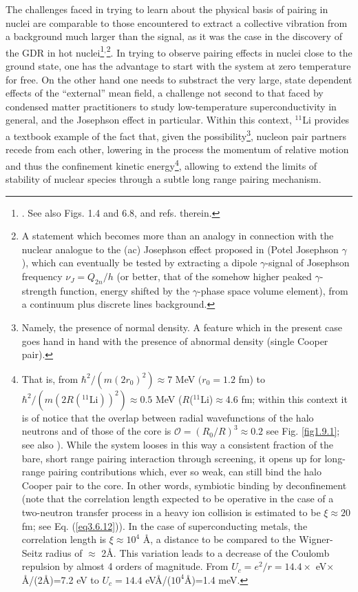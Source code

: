 The challenges faced in trying to learn about the physical basis of pairing in nuclei are comparable to those encountered to extract a   collective vibration from a background much larger than the signal, as it was the case  in the discovery of the GDR in hot nuclei\footnote{\cite{Snover:86,Gaardhoje:85,Gaardhoje:86}. See also \cite{Bortignon:98} Figs. 1.4 and 6.8, and refs. therein.}$^,$\footnote{A statement which becomes more than an analogy in connection with the nuclear analogue to the (ac) Josephson effect proposed in \cite{Potel:20b,yy} (Potel Josephson $\gamma$), which can eventually be tested by extracting a dipole $\gamma$-signal of Josephson frequency $\nu_J=Q_{2n}/h$ (or better, that of the somehow higher peaked $\gamma$-strength function, energy shifted by the $\gamma$-phase space volume element), from a continuum plus discrete lines background.}. In trying to observe  pairing effects in nuclei close to the ground state, one has the advantage to start with the system at zero temperature for free. On the other hand one needs to substract the very large, state dependent effects of the ``external'' mean field, a challenge not second to that faced by condensed matter practitioners to study low-temperature superconductivity in general, and the Josephson effect in particular.  Within this context, $^{11}$Li provides a textbook example of the fact that, given the possibility\footnote{\label{f39C4} Namely, the presence of normal density. A feature which in the present case goes hand in hand with the presence of abnormal density (single Cooper pair).}, nucleon pair partners recede from each other, lowering in the process the momentum of relative motion and thus the confinement kinetic 
 energy\footnote{\label{f40C4} That is, from $\hbar^2/(m(2r_0)^2)\approx 7$ MeV $(r_0=1.2$ fm) to $\hbar^2/(m(2R(^{11}\text{Li}))^2)\approx 0.5$ MeV ($R$($^{11}$Li)$\approx$4.6 fm; within this context it is of notice that the overlap between radial wavefunctions of the halo neutrons and of those of the core is $\mathcal O=(R_0/R)^3\approx0.2$  see Fig. \ref{fig1.9.1}; see also \cite{Broglia:19b}). While the system looses in this way a consistent fraction of the bare, short range pairing interaction through screening, it opens up for long-range pairing contributions which, ever so weak, can still bind the halo Cooper pair to the core. In other words, symbiotic binding by  deconfinement (note that the correlation length expected to be operative in the case of a two-neutron transfer process in a heavy ion collision is estimated to be $\xi\approx20$ fm;  see Eq. (\ref{eq3.6.12})). In the case of superconducting metals, the correlation length is $\xi\approx 10^4$ \AA, a distance to be compared to the Wigner-Seitz radius of $\approx$ 2\AA. This variation leads to a decrease of the Coulomb repulsion by almost 4 orders of magnitude. From $U_c=e^2/r=14.4\times$ eV$\times$\AA/(2\AA)=7.2 eV to $U_c=14.4$ eV\AA/($10^4$\AA)=1.4 meV.}, allowing to extend the limits of stability of nuclear species through a subtle long range pairing mechanism. 

